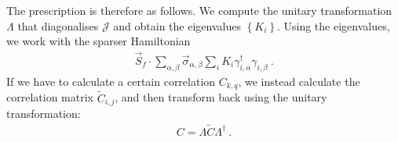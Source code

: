 \documentclass[%
reprint,
superscriptaddress,
groupedaddress,
superscriptaddress,
onecolumn,
10pt
]{revtex4-2}
\begin{document}
The prescription is therefore as follows. We compute the unitary transformation \(\Lambda\) that diagonalises \(\mathcal{J}\) and obtain the eigenvalues \(\left\{K_i\right\}\). Using the eigenvalues, we work with the sparser Hamiltonian
\begin{equation}\begin{aligned}
	\vec{S}_f \cdot \sum_{\alpha,\beta}\vec{\sigma}_{\alpha,\beta}\sum_i K_i \gamma^\dagger_{i,\alpha}\gamma_{i,\beta}~.
\end{aligned}\end{equation}
If we have to calculate a certain correlation \(C_{k,q}\), we instead calculate the correlation matrix \(\tilde C_{i,j}\), and then transform back using the unitary transformation:
\begin{equation}\begin{aligned}
	C = \Lambda \tilde C \Lambda^\dagger~.
\end{aligned}\end{equation}
\end{document}
